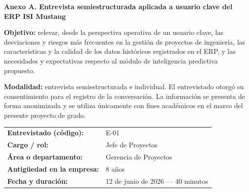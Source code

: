 \documentclass{univalle-perfil}
\begin{document}
\noindent\textbf{\large Anexo A. Entrevista semiestructurada aplicada a usuario clave del ERP ISI Mustang}\label{anexo:A}

\textbf{Objetivo:} relevar, desde la perspectiva operativa de un usuario clave, las desviaciones y riesgos más frecuentes en la gestión de proyectos de ingeniería, las características y la calidad de los datos históricos registrados en el ERP, y las necesidades y expectativas respecto al módulo de inteligencia predictiva propuesto.

\textbf{Modalidad:} entrevista semiestructurada e individual. El entrevistado otorgó su consentimiento para el registro de la conversación. La información se presenta de forma anonimizada y se utiliza únicamente con fines académicos en el marco del presente proyecto de grado.

\vspace{0.5\baselineskip}
\noindent\begin{tabular}{@{}p{5.4cm}p{9.6cm}@{}}
\textbf{Entrevistado (código):}    & E-01 \\[6pt]
\textbf{Cargo / rol:}              & Jefe de Proyectos \\[6pt]
\textbf{Área o departamento:}      & Gerencia de Proyectos \\[6pt]
\textbf{Antigüedad en la empresa:} & 8 años \\[6pt]
\textbf{Fecha y duración:}         & 12 de junio de 2026 --- 40 minutos \\[6pt]
\end{tabular}
\end{document}
